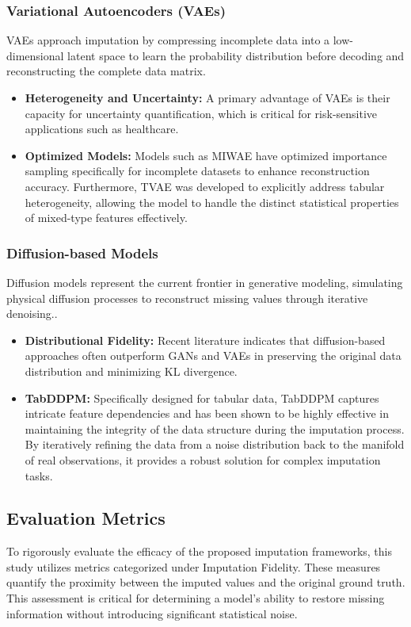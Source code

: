 \documentclass[twocolumn, 9pt]{extarticle}
\begin{document}
\subsubsection{Variational Autoencoders (VAEs)}
VAEs approach imputation by compressing incomplete data into a low-dimensional latent space to learn the probability distribution before decoding and reconstructing the complete data matrix.\cite{Mattei2019}
\begin{itemize}
    \item \textbf{Heterogeneity and Uncertainty:} A primary advantage of VAEs is their capacity for uncertainty quantification, which is critical for risk-sensitive applications such as healthcare.
    \item \textbf{Optimized Models:} Models such as MIWAE have optimized importance sampling specifically for incomplete datasets to enhance reconstruction accuracy. Furthermore, TVAE was developed to explicitly address tabular heterogeneity, allowing the model to handle the distinct statistical properties of mixed-type features effectively.
\end{itemize}

\subsubsection{Diffusion-based Models}
Diffusion models represent the current frontier in generative modeling, simulating physical diffusion processes to reconstruct missing values through iterative denoising.\cite{Kotelnikov2023}.
\begin{itemize}
    \item \textbf{Distributional Fidelity:} Recent literature indicates that diffusion-based approaches often outperform GANs and VAEs in preserving the original data distribution and minimizing KL divergence.
    \item \textbf{TabDDPM:} Specifically designed for tabular data, TabDDPM captures intricate feature dependencies and has been shown to be highly effective in maintaining the integrity of the data structure during the imputation process. By iteratively refining the data from a noise distribution back to the manifold of real observations, it provides a robust solution for complex imputation tasks. 
\end{itemize}

\subsection{Evaluation Metrics}
To rigorously evaluate the efficacy of the proposed imputation frameworks, this study utilizes metrics categorized under Imputation Fidelity. These measures quantify the proximity between the imputed values and the original ground truth. This assessment is critical for determining a model's ability to restore missing information without introducing significant statistical noise.
\end{document}
